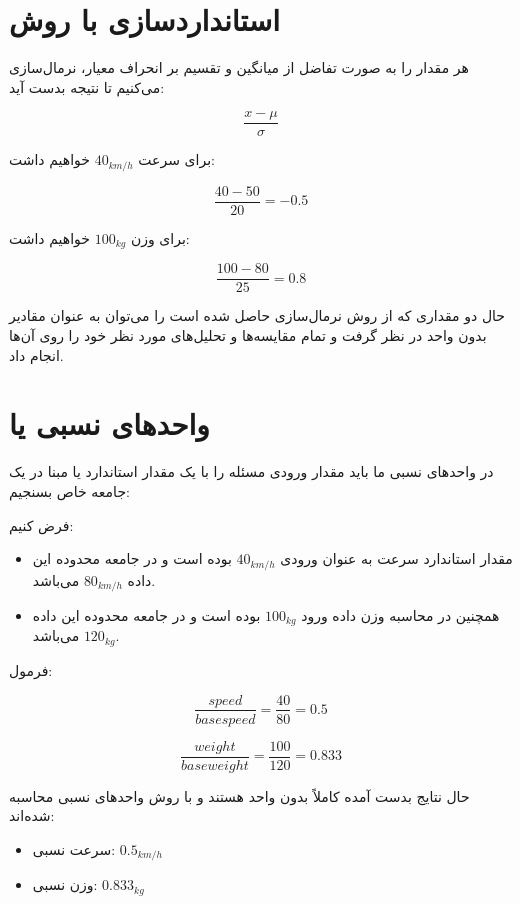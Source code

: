 \documentclass[a4paper]{article}
\begin{document}
\section{استانداردسازی با روش }

هر مقدار را به صورت تفاضل از میانگین و تقسیم بر انحراف معیار، نرمال‌سازی می‌کنیم
تا نتیجه  بدست آید:

\begin{equation}
    \frac{x - \mu}{\sigma}
\end{equation}

برای سرعت $40_{km/h}$ خواهیم داشت:

\begin{equation}
    \frac{40 - 50}{20} = -0.5
\end{equation}

برای وزن $100_{kg}$ خواهیم داشت:

\begin{equation}
    \frac{100 - 80}{25} = 0.8
\end{equation}

حال دو مقداری که از روش نرمال‌سازی  حاصل شده است را می‌توان به عنوان
مقادیر بدون واحد در نظر گرفت و تمام مقایسه‌ها و تحلیل‌های مورد نظر خود را روی
آن‌ها انجام داد.

\section{واحد‌های نسبی یا }

در واحد‌های نسبی ما باید مقدار ورودی مسئله را با یک مقدار استاندارد یا مبنا در
یک جامعه خاص بسنجیم:

فرض کنیم:

\begin{itemize}
    \item مقدار استاندارد سرعت به عنوان ورودی $40_{km/h}$ بوده است و در جامعه
    محدوده این داده $80_{km/h}$ می‌باشد.
    \item همچنین در محاسبه وزن داده ورود $100_{kg}$ بوده است و در جامعه محدوده
    این داده $120_{kg}$ می‌باشد.
\end{itemize}

فرمول:

\begin{equation}
    \frac{speed}{base speed} = \frac{40}{80} = 0.5
\end{equation}

\begin{equation}
    \frac{weight}{base weight} = \frac{100}{120} = 0.833
\end{equation}

حال نتایج بدست آمده کاملاً بدون واحد هستند و با روش واحد‌های نسبی محاسبه
شده‌اند:

\begin{itemize}
    \item سرعت نسبی: $0.5_{km/h}$
    \item وزن نسبی: $0.833_{kg}$
\end{itemize}



\end{document}
